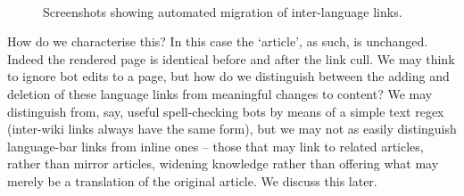 \begin{figure}
  \centering {}\\ 
\caption{Screenshots showing automated migration of inter-language
  links.}
\label{fig:traj-bot-explanation}
\end{figure}

How do we characterise this? In this case the `article', as such, is
unchanged. Indeed the rendered page is identical before and after the
link cull. We may think to ignore bot edits to a page, but how do we
distinguish between the adding and deletion of these language links
from meaningful changes to content? We may distinguish from, say,
useful spell-checking bots by means of a simple text regex (inter-wiki
links always have the same form), but we may not as easily distinguish
language-bar links from inline ones -- those that may link to related
articles, rather than mirror articles, widening knowledge rather than
offering what may merely be a translation of the original
article. We discuss this later.

